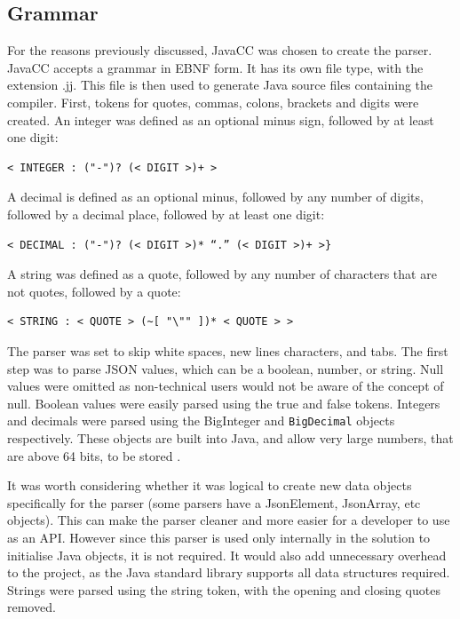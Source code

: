 \subsection{Grammar}
For the reasons previously discussed, JavaCC was chosen to create the parser. JavaCC accepts a grammar in EBNF form. It has its own file type, with the extension .jj. This file is then used to generate Java source files containing the compiler. First, tokens for quotes, commas, colons, brackets and digits were created. An integer was defined as an optional minus sign, followed by at least one digit:
\begin{verbatim}
< INTEGER : ("-")? (< DIGIT >)+ >
\end{verbatim}
A decimal is defined as an optional minus, followed by any number of digits, followed by a decimal place, followed by at least one digit:
\begin{verbatim}
< DECIMAL : ("-")? (< DIGIT >)* “.” (< DIGIT >)+ >}
\end{verbatim}
A string was defined as a quote, followed by any number of characters that are not quotes, followed by a quote:
\begin{verbatim}
< STRING : < QUOTE > (~[ "\"" ])* < QUOTE > >
\end{verbatim}
The parser was set to skip white spaces, new lines characters, and tabs. The first step was to parse JSON values, which can be a boolean, number, or string. Null values were omitted as non-technical users would not be aware of the concept of null. Boolean values were easily parsed using the true and false tokens. Integers and decimals were parsed using the BigInteger and \texttt{BigDecimal} objects respectively. These objects are built into Java, and allow very large numbers, that are above 64 bits, to be stored \cite{big_integer_big_decimal}.\par
It was worth considering whether it was logical to create new data objects specifically for the parser (some parsers have a JsonElement, JsonArray, etc objects). This can make the parser cleaner and more easier for a developer to use as an API. However since this parser is used only internally in the solution to initialise Java objects, it is not required. It would also add unnecessary overhead to the project, as the Java standard library supports all data structures required. Strings were parsed using the string token, with the opening and closing quotes removed.
